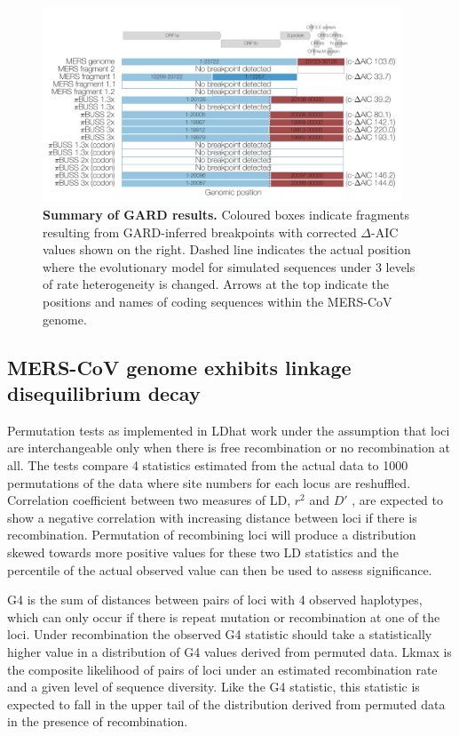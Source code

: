 \documentclass[11pt,oneside,letterpaper]{article}
\begin{document}
\begin{figure}[h]
	\centering
	\includegraphics[width=0.95\textwidth]{figures/MERS_GARD_summary.png}
	\caption{\textbf{Summary of GARD results.}
Coloured boxes indicate fragments resulting from GARD-inferred breakpoints with corrected $\Delta$-AIC values shown on the right.
Dashed line indicates the actual position where the evolutionary model for simulated sequences under 3 levels of rate heterogeneity is changed.
Arrows at the top indicate the positions and names of coding sequences within the MERS-CoV genome.}
	\label{gard}
\end{figure}

\subsection*{MERS-CoV genome exhibits linkage disequilibrium decay}
Permutation tests as implemented in LDhat work under the assumption that loci are interchangeable only when there is free recombination or no recombination at all.
The tests compare 4 statistics estimated from the actual data to 1000 permutations of the data where site numbers for each locus are reshuffled.
Correlation coefficient between two measures of LD, $r^{2}$ \citep{hill_1968} and $D'$ \citep{lewontin_1964}, are expected to show a negative correlation with increasing distance between loci if there is recombination.
Permutation of recombining loci will produce a distribution skewed towards more positive values for these two LD statistics and the percentile of the actual observed value can then be used to assess significance.

G4 is the sum of distances between pairs of loci with 4 observed haplotypes, which can only occur if there is repeat mutation or recombination at one of the loci.
Under recombination the observed G4 statistic should take a statistically higher value in a distribution of G4 values derived from permuted data.
Lkmax is the composite likelihood of pairs of loci under an estimated recombination rate and a given level of sequence diversity.
Like the G4 statistic, this statistic is expected to fall in the upper tail of the distribution derived from permuted data in the presence of recombination.
\end{document}
